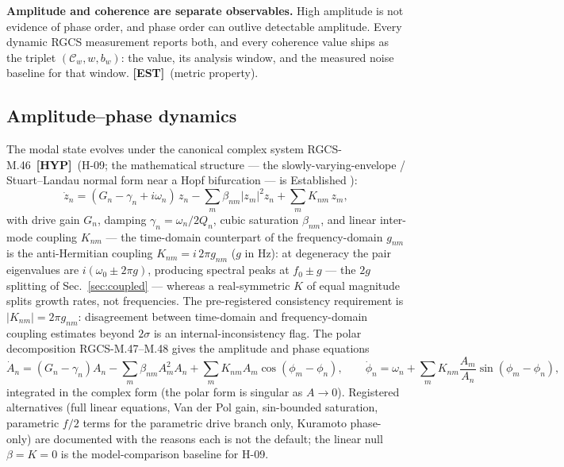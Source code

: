 \documentclass[10pt,letterpaper]{article}
\newcommand{\cltag}[2]{\textcolor{#1}{{\fontspec{TeX Gyre Heros}\scriptsize\bfseries[#2]}}}
\newcommand{\EST}{\cltag{estcol}{EST}}   %
\newcommand{\HYP}{\cltag{hypcol}{HYP}}   %
\newcommand{\eqid}[1]{\textcolor{inkgray}{\scriptsize\textsf{#1}}}
\newcommand{\Cw}{\mathcal{C}_{w}}
\begin{document}
\begin{center}
\colorbox{soft}{\parbox{0.9\linewidth}{\small\textbf{Amplitude and
coherence are separate observables.} High amplitude is not evidence of
phase order, and phase order can outlive detectable amplitude. Every
dynamic RGCS measurement reports both, and every coherence value ships as
the triplet $(\Cw, w, b_w)$: the value, its analysis window, and the
measured noise baseline for that window. \EST\ (metric property).}}
\end{center}

\subsection{Amplitude--phase dynamics}\label{sec:dynamics}

The modal state evolves under the canonical complex system
\eqid{RGCS-M.46}\ \HYP\ (H-09; the mathematical structure — the
slowly-varying-envelope / Stuart--Landau normal form near a Hopf
bifurcation — is Established \citep{guckenheimer1983,pikovsky2001}):
\begin{equation}
\dot z_n = (G_n - \gamma_n + i\omega_n)\, z_n
- \sum_m \beta_{nm} |z_m|^2 z_n
+ \sum_m K_{nm}\, z_m ,
\label{eq:sl}
\end{equation}
with drive gain $G_n$, damping $\gamma_n = \omega_n/2Q_n$, cubic
saturation $\beta_{nm}$, and linear inter-mode coupling $K_{nm}$ — the
time-domain counterpart of the frequency-domain $g_{nm}$ is the
anti-Hermitian coupling $K_{nm} = i\,2\pi g_{nm}$ ($g$ in Hz): at
degeneracy the pair eigenvalues are $i(\omega_0 \pm 2\pi g)$, producing
spectral peaks at $f_0 \pm g$ — the $2g$ splitting of
Sec.~\ref{sec:coupled} — whereas a real-symmetric $K$ of equal magnitude
splits growth rates, not frequencies. The pre-registered consistency
requirement is $|K_{nm}| = 2\pi g_{nm}$: disagreement between
time-domain and frequency-domain coupling estimates
beyond $2\sigma$ is an internal-inconsistency flag. The polar
decomposition \eqid{RGCS-M.47--M.48} gives the amplitude and phase
equations
\begin{equation}
\dot A_n = (G_n - \gamma_n) A_n - \sum_m \beta_{nm} A_m^2 A_n
+ \sum_m K_{nm} A_m \cos(\phi_m - \phi_n),
\qquad
\dot\phi_n = \omega_n + \sum_m K_{nm}\frac{A_m}{A_n}\sin(\phi_m - \phi_n),
\end{equation}
integrated in the complex form (the polar form is singular as $A \to 0$).
Registered alternatives (full linear equations, Van der Pol gain,
sin-bounded saturation, parametric $f/2$ terms for the parametric drive
branch only, Kuramoto phase-only) are documented with the reasons each is
not the default; the linear null $\beta = K = 0$ is the model-comparison
baseline for H-09.
\end{document}
